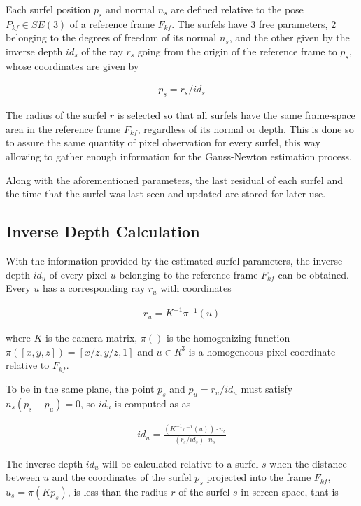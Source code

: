 \documentclass[1p]{elsarticle}
\begin{document}
Each surfel position $p_{s}$ and normal $n_{s}$ are defined relative to the pose $P_{kf} \in SE(3)$ of a reference frame $F_{kf}$. The surfels have $3$ free parameters, $2$ belonging to the degrees of freedom of its normal $n_{s}$, and the other given by the inverse depth $id_{s}$ of the ray $r_{s}$ going from the origin of the reference frame to $p_{s}$, whose coordinates are given by

\begin{align}
	p_{s} = r_{s}/id_{s} 
	\label{point_equation}
\end{align}
 
The radius of the surfel $r$ is selected so that all surfels have the same frame-space area in the reference frame $F_{kf}$, regardless of its normal or depth. This is done so to assure the same quantity of pixel observation for every surfel, this way allowing to gather enough information for the Gauss-Newton estimation process.

Along with the aforementioned parameters, the last residual of each surfel and the time that the surfel was last seen and updated are stored for later use.

\subsection{Inverse Depth Calculation}
\label{sec:inverse_depth_calculation}

With the information provided by the estimated surfel parameters, the inverse depth $id_{u}$ of every pixel $u$ belonging to the reference frame $F_{kf}$ can be obtained. Every $u$ has a corresponding ray $r_{u}$ with coordinates

\begin{align}
	r_{u} = K^{-1}\pi^{-1}(u)
	\label{ray_equation}
\end{align}

where $K$ is the camera matrix, $\pi()$ is the homogenizing function $\pi([x, y, z]) = [x/z, y/z, 1]$ and $u \in R^{3}$ is a homogeneous pixel coordinate relative to $F_{kf}$.

To be in the same plane, the point $p_{s}$ and $p_{u} = r_{u}/id_{u}$ must satisfy $n_{s}(p_{s} - p_{u}) = 0$, so $id_{u}$ is computed as as

\begin{align}
	id_{u} = \frac{ (K^{-1}\pi^{-1}(u)) \cdot n_{s}}{(r_{s}/id_{s}) \cdot n_{s}} 
	\label{equ:depth_calculation}
\end{align}

The inverse depth $id_{u}$ will be calculated relative to a surfel $s$ when the distance between $u$ and the coordinates of the surfel $p_{s}$ projected into the frame $F_{kf}$, $u_{s} = \pi(K p_{s})$, is less than the radius $r$ of the surfel $s$ in screen space, that is
\end{document}
